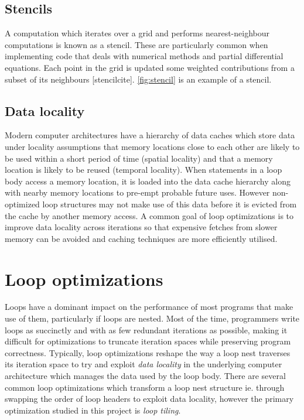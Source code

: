 \documentclass[a4paper,12pt,twoside]{report}
\begin{document}
\subsection*{Stencils}
A computation which iterates over a grid and performs nearest-neighbour computations is known as a stencil. These are
particularly common when implementing code that deals with numerical methods and partial differential equations.
Each point in the grid is updated some weighted contributions from a subset of its neighbours [stencilcite]. \ref{fig:stencil} is an example of a stencil.

\subsection*{Data locality}
Modern computer architectures have a hierarchy of data caches which store data under locality assumptions that memory locations close to each other
are likely to be used within a short period of time (spatial locality) and that a memory location is likely to be reused (temporal locality). 
When statements in a loop body access a memory location, it is loaded into the data cache hierarchy along with nearby memory locations to pre-empt probable future uses.
However non-optimized loop structures may not make use of this data before it is evicted from the cache by another memory access.
A common goal of loop optimizations is to improve data locality across iterations so that expensive fetches from slower memory can be avoided 
and caching techniques are more efficiently utilised.

\section{Loop optimizations}
Loops have a dominant impact on the performance of most programs that make use of them, particularly if loops are nested.
Most of the time, programmers write loops as succinctly and with as few redundant iterations as possible, making it difficult
for optimizations to truncate iteration spaces while preserving program correctness. Typically, loop optimizations reshape the
way a loop nest traverses its iteration space to try and exploit \textit{data locality} in the underlying computer architecture which
manages the data used by the loop body. There are several common loop optimizations which transform a loop nest structure ie. through
swapping the order of loop headers to exploit data locality, however the primary optimization studied in this project is \textit{loop tiling}.
\end{document}

